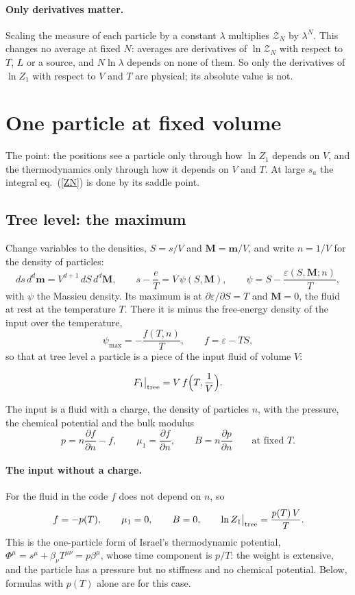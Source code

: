 \documentclass[11pt,aps,preprint,nofootinbib,superscriptaddress,tightenlines]{revtex4-2}
\def\st{\begin{equation}}
\def\stp{\end{equation}}
\def\Eq#1{eq.~(\ref{#1})}
\let\oldparagraph\paragraph
\renewcommand{\paragraph}{\par\bigskip\oldparagraph}
\begin{document}
\paragraph{Only derivatives matter.}  Scaling the measure of each particle by a constant $\lambda$ multiplies $\mathcal Z_N$ by $\lambda^N$.  This changes no
average at fixed $N$: averages are derivatives of $\ln\mathcal Z_N$ with respect to $T$, $L$ or a source, and $N\ln\lambda$ depends on none of them.  So
only the derivatives of $\ln Z_1$ with respect to $V$ and $T$ are physical; its absolute value is not.

\section{One particle at fixed volume}
\label{sec:one}

The point: the positions see a particle only through how $\ln Z_1$ depends on $V$, and the thermodynamics only through how it depends on $V$ and $T$.
At large $s_a$ the integral \Eq{ZN} is done by its saddle point.

\subsection{Tree level: the maximum}
\label{sec:tree}

Change variables to the densities, $S=s/V$ and $\bm M=\bm m/V$, and write $n=1/V$ for the density of particles:
\st
ds\,d^d\bm m=V^{d+1}\,dS\,d^d\bm M,\qquad s-\frac eT=V\,\psi(S,\bm M),\qquad \psi=S-\frac{\varepsilon(S,\bm M;n)}T ,
\stp
with $\psi$ the Massieu density.  Its maximum is at $\partial\varepsilon/\partial S=T$ and $\bm M=0$, the fluid at rest at the temperature $T$.  There it is
minus the free-energy density of the input over the temperature,
\st
\psi_{\max}=-\frac{f(T,n)}T,\qquad f=\varepsilon-TS ,
\stp
so that at tree level a particle is a piece of the input fluid of volume $V$:
\begin{keyeq}
\st
F_1\big|_{\rm tree}=V\,f\Big(T,\frac1V\Big) .
\label{Ftree}
\stp
\end{keyeq}
The input is a fluid with a charge, the density of particles $n$, with the pressure, the chemical potential and the bulk modulus
\st
p=n\frac{\partial f}{\partial n}-f,\qquad \mu_1=\frac{\partial f}{\partial n},\qquad B=n\frac{\partial p}{\partial n}\qquad\text{at fixed }T .
\stp

\paragraph{The input without a charge.}  For the fluid in the code $f$ does not depend on $n$, so
\st
f=-p(T),\qquad \mu_1=0,\qquad B=0,\qquad \ln Z_1\big|_{\rm tree}=\frac{p(T)\,V}T .
\stp
This is the one-particle form of Israel's thermodynamic potential, $\Phi^\mu=s^\mu+\beta_\nu T^{\mu\nu}=p\beta^\mu$, whose time component is $p/T$: the weight
is extensive, and the particle has a pressure but no stiffness and no chemical potential.  Below, formulas with $p(T)$ alone are for this case.
\end{document}
